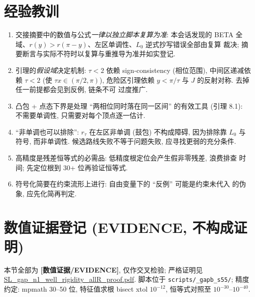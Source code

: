 \documentclass[UTF8]{ctexart}
\newcommand{\EVID}{\textbf{[数值证据/EVIDENCE]}}
\begin{document}
\section{经验教训}

\begin{enumerate}
	\item 交接摘要中的数值与公式\emph{一律以独立脚本复算为准}: 本会话发现的
		BETA 全域、$r(y)>r(\pi-y)$、左区单调性、$L_0$ 逆式抄写错误全部由复算
		裁决; 摘要断言与实际不符时以复算与重推导为准并如实登记.
	\item 引理的\emph{假设域}决定机制: $\tau<2$ 依赖 sign-consistency (相位范围),
		中间区递减依赖 $\tau<2$ (使 $\tau x\in(\pi/2,\pi)$), 危险区引理依赖
		$y<\pi/\tau$ 与 $J$ 的反射对称. 去掉任一前提都会见到反例, 链条不可
		过度推广.
	\item 凸包 + 点态下界是处理 ``两相位同时落在同一区间'' 的有效工具
		(引理 8.1): 不需要单调性, 只需要对每个顶点逐一估计.
	\item ``非单调也可以排除'': $r_\tau$ 在左区非单调 (鼓包) 不构成障碍,
		因为排除靠 $L_0$ 与符号, 而非单调性. 候选路线失败不等于问题失败,
		应寻找更弱的充分条件.
	\item 高精度是残差恒等式的必需品: 低精度根定位会产生假非零残差, 浪费排查
		时间; 先定位根到 30+ 位再验证恒等式.
	\item 符号化简要在约束流形上进行: 自由变量下的 ``反例'' 可能是约束未代入
		的伪象, 应先化简再判定.
\end{enumerate}

\section{数值证据登记 (EVIDENCE, 不构成证明)}\label{sec:evidence}

本节全部为 \EVID{}, 仅作交叉检验; 严格证明见
\url{SL_gap_n1_well_rigidity_allR_proof.pdf}. 脚本位于
\texttt{scripts/\_gapb\_s55/}; 精度约定: mpmath 30--50 位, 特征值求根 bisect
xtol $10^{-12}$, 恒等式对照至 $10^{-30}$--$10^{-40}$.
\end{document}
